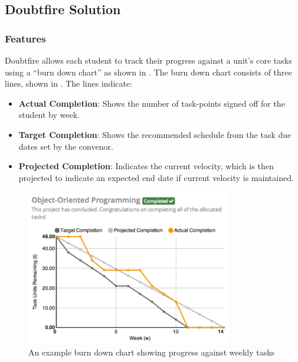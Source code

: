 
\subsection{Doubtfire Solution} %
\label{sub:doubtfire_solution}

\subsubsection{Features} %
\label{ssub:features}

Doubtfire allows each student to track their progress against a unit's core tasks using a ``burn down chart'' as shown in . The burn down chart consists of three lines, shown in . The lines indicate:
\begin{itemize}[noitemsep,nolistsep]
  \item \textbf{Actual Completion}: Shows the number of task-points signed off for the student by week.
  \item \textbf{Target Completion}: Shows the recommended schedule from the task due dates set by the convenor.
  \item \textbf{Projected Completion}: Indicates the current velocity, which is then projected to indicate an expected end date if current velocity is maintained.
\end{itemize}

\begin{figure}[thb]
  \centering
  \includegraphics[width=0.8\textwidth]{ExampleChart}
  \caption{An example burn down chart showing progress against weekly tasks}
  \label{fig:example_chart}
\end{figure}

